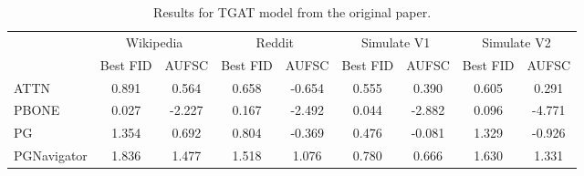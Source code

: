 \begin{table}
\centering
\caption{Results for TGAT model from the original paper.}
\label{tab:tgat_results_og}
\begin{tabular}{lcccccccc}
\toprule
 & \multicolumn{2}{c}{Wikipedia} & \multicolumn{2}{c}{Reddit} & \multicolumn{2}{c}{Simulate V1} & \multicolumn{2}{c}{Simulate V2} \\
 & Best FID & AUFSC & Best FID & AUFSC & Best FID & AUFSC & Best FID & AUFSC \\
\midrule
ATTN & 0.891 & 0.564 & 0.658 & -0.654 & 0.555 & 0.390 & 0.605 & 0.291 \\
PBONE & 0.027 & -2.227 & 0.167 & -2.492 & 0.044 & -2.882 & 0.096 & -4.771 \\
PG & 1.354 & 0.692 & 0.804 & -0.369 & 0.476 & -0.081 & 1.329 & -0.926 \\
PGNavigator & 1.836 & 1.477 & 1.518 & 1.076 & 0.780 & 0.666 & 1.630 & 1.331 \\
\bottomrule
\end{tabular}
\end{table}
